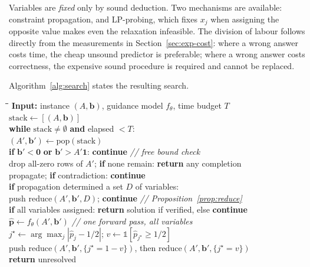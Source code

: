 \documentclass[final,5p,times,twocolumn]{elsarticle}
\begin{document}
Variables are \emph{fixed} only by sound deduction. Two mechanisms are available: constraint propagation, and LP-probing, which fixes $x_j$ when assigning the opposite value makes even the relaxation infeasible. The division of labour follows directly from the measurements in Section~\ref{sec:exp-cost}: where a wrong answer costs time, the cheap unsound predictor is preferable; where a wrong answer costs correctness, the expensive sound procedure is required and cannot be replaced.

Algorithm~\ref{alg:search} states the resulting search.

\begin{algorithm}[h]
\caption{Guided backtracking search for a BLS}
\label{alg:search}
\small
\begin{tabbing}
\hspace{6mm}\=\hspace{6mm}\=\hspace{6mm}\=\kill
\textbf{Input:} instance $(A,\mathbf{b})$, guidance model $f_\theta$, time budget $T$ \\
$\mathrm{stack} \gets [(A,\mathbf{b})]$ \\
\textbf{while} $\mathrm{stack}\ne\emptyset$ \textbf{and} elapsed $<T$: \\
\> $(A',\mathbf{b}') \gets \mathrm{pop}(\mathrm{stack})$ \\
\> \textbf{if} $\mathbf{b}' < \mathbf{0}$ \textbf{or} $\mathbf{b}' > A'\mathbf{1}$: \textbf{continue} \hfill \textit{// free bound check} \\
\> drop all-zero rows of $A'$; \textbf{if} none remain: \textbf{return} any completion \\
\> propagate; \textbf{if} contradiction: \textbf{continue} \\
\> \textbf{if} propagation determined a set $D$ of variables: \\
\> \> push $\mathrm{reduce}(A',\mathbf{b}',D)$; \textbf{continue} \hfill \textit{// Proposition~\ref{prop:reduce}} \\
\> \textbf{if} all variables assigned: \textbf{return} solution if verified, else \textbf{continue} \\
\> $\hat{\mathbf{p}} \gets f_\theta(A',\mathbf{b}')$ \hfill \textit{// one forward pass, all variables} \\
\> $j^\star \gets \arg\max_j |\hat{p}_j - 1/2|$; \quad $v \gets \mathbb{1}[\hat{p}_{j^\star}\ge 1/2]$ \\
\> push $\mathrm{reduce}(A',\mathbf{b}',\{j^\star{=}1{-}v\})$, then $\mathrm{reduce}(A',\mathbf{b}',\{j^\star{=}v\})$ \\
\textbf{return} unresolved
\end{tabbing}
\end{algorithm}
\end{document}
